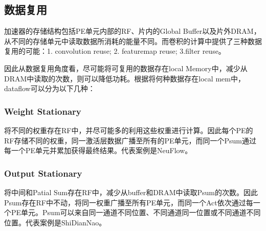 \documentclass[UTF8]{scrartcl}
\begin{document}
	 \subsection{数据复用}
	 加速器的存储结构包括PE单元内部的RF、片内的Global Buffer以及片外DRAM，从不同的存储单元中读取数据所消耗的能量不同。而卷积的计算中提供了三种数据复用的可能：1. convolution reuse; 2. featuremap reuse; 3.filter reuse。
	 
	 
	 因此从数据复用角度看，尽可能将可复用的数据存在local Memory中，减少从DRAM中读取的次数，则可以降低功耗。根据将何种数据存在local mem中，dataflow可以分为以下几种\cite{sze2017efficient}：
		 \subsubsection{Weight Stationary}
		 将不同的权重存在RF中，并尽可能多的利用这些权重进行计算。因此每个PE的RF存储不同的权重，同一激活层数据广播至所有的PE单元，而同一个Psum通过每一个PE单元并累加获得最终结果。代表案例是NeuFlow\cite{neoflow}。
		 \subsubsection{Output Stationary}
		 将中间和Patial Sum存在RF中，减少从buffer和DRAM中读取Psum的次数。因此Psum存在RF中不动，将同一权重广播至所有PE单元，而同一个Act依次通过每一个PE单元。Psum可以来自同一通道不同位置、不同通道同一位置或不同通道不同位置。代表案例是ShiDianNao\cite{du2015shidiannao}。
		 
\end{document}

